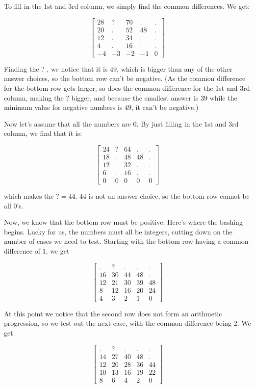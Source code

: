 \begin{enumerate}
 To fill in the $1$st and $3$rd column, we simply find the common differences. We get:

 
 \[\begin{bmatrix} 28&?&70&.&. \\ 20&.&52&48&.\\ 12&.&34&.&.\\ 4&.&16&.&.\\ -4&-3&-2&-1&0\end{bmatrix}\]

 Finding the $?$ , we notice that it is $49$, which is bigger than any of the other answer choices, so the bottom row can't be negative. (As the common difference for the bottom row gets larger, so does the common difference for the $1$st and $3$rd column, making the $?$ bigger, and because the smallest answer is $39$ while the minimum value for negative numbers is $49$, it can't be negative.)

 Now let's assume that all the numbers are 0. By just filling in the $1$st and $3$rd column, we find that it is:

 
 \[\begin{bmatrix} 24 & ? &64&.&. \\ 18&.&48&48&.\\ 12&.&32&.&.\\ 6&.&16&.&.\\ 0&0&0&0&0\end{bmatrix}\]

 which makes the $?=44$. $44$ is not an answer choice, so the bottom row cannot be all $0$'s.

 Now, we know that the bottom row must be positive. Here's where the bashing begins. Lucky for us, the numbers must all be integers, cutting down on the number of cases we need to test. Starting with the bottom row having a common difference of $1$, we get

 
 \[\begin{bmatrix} . & ? &.&.&. \\ 16&30&44&48&.\\ 12&21&30&39&48\\ 8&12&16&20&24\\ 4&3&2&1&0\end{bmatrix}\]

 At this point we notice that the second row does not form an arithmetic progression, so we test out the next case, with the common difference being $2$. We get

 
 \[\begin{bmatrix} . & ? &.&.&. \\ 14&27&40&48&.\\ 12&20&28&36&44\\ 10&13&16&19&22\\ 8&6&4&2&0\end{bmatrix}\]


\end{enumerate}
